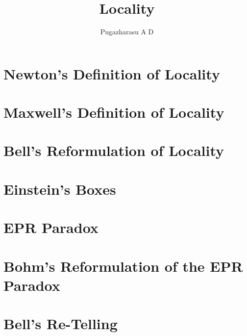 \documentclass[]{article}
\title{Locality}
\author{Pugazharasu A D}
\begin{document}
\maketitle

\begin{abstract}

\end{abstract}

\section{Newton's Definition of Locality}
\section{Maxwell's Definition of Locality}
\section{Bell's Reformulation of Locality}
\section{Einstein's Boxes}
\section{EPR Paradox}
\section{Bohm's Reformulation of the EPR Paradox}
\section{Bell's Re-Telling}
\end{document}
